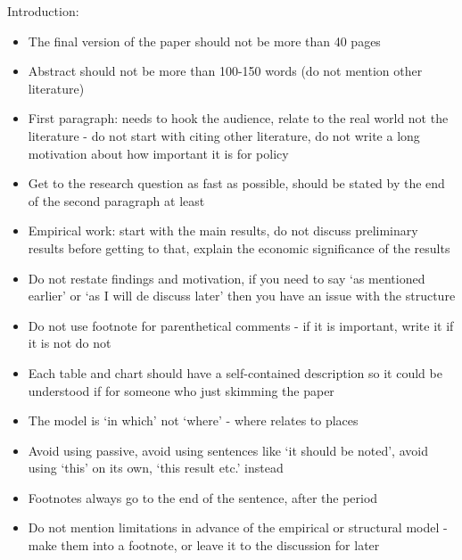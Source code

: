 \documentclass[12pt]{article}
\begin{document}
Introduction:
\begin{itemize} \setlength\itemsep{0em}  \small
    \item The final version of the paper should not be more than 40 pages
    \item Abstract should not be more than 100-150 words (do not mention other literature)
    \item First paragraph: needs to hook the audience, relate to the real world not the literature  - do not start with citing other literature, do not write a long motivation about how important it is for policy
    \item Get to the research question as fast as possible, should be stated by the end of the second paragraph at least
    \item Empirical work: start with the main results, do not discuss preliminary results before getting to that, explain the economic significance of the results
    \item Do not restate findings and motivation, if you need to say `as mentioned earlier' or `as I will de discuss later' then you have an issue with the structure
    \item Do not use footnote for parenthetical comments - if it is important, write it if it is not do not
    \item Each table and chart should have a self-contained description so it could be understood if for someone who just skimming the paper
    \item The model is `in which' not `where' - where relates to places
    \item Avoid using passive, avoid using sentences like `it should be noted', avoid using `this' on its own, `this result etc.' instead
    \item Footnotes always go to the end of the sentence, after the period
    \item Do not mention limitations in advance of the empirical or structural model - make them into a footnote, or leave it to the discussion for later
\end{itemize} \normalsize
\end{document}
